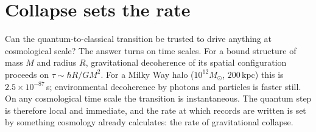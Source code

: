 \section{Collapse sets the rate}
Can the quantum-to-classical transition be trusted to drive anything at cosmological scale? The answer turns on time scales. For a bound structure of
mass $M$ and radius $R$, gravitational decoherence of its spatial configuration proceeds on $\tau\sim\hbar R/GM^2$. For a Milky Way halo
($10^{12}M_\odot$, $200$\,kpc) this is $2.5\times10^{-87}$\,s; environmental decoherence by photons and particles is faster still. On any cosmological
time scale the transition is instantaneous. The quantum step is therefore local and immediate, and the rate at which records are written is set by
something cosmology already calculates: the rate of gravitational collapse.

